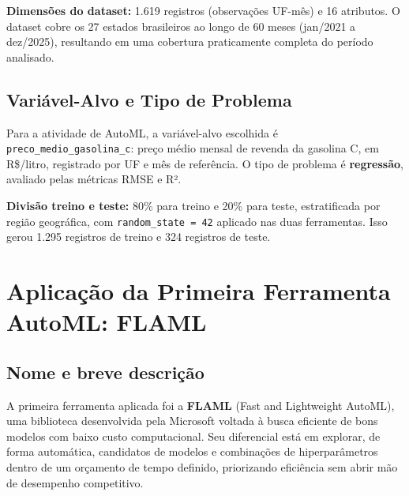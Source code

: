 \documentclass[11pt, a4paper, oneside]{article}
\begin{document}
\begin{infobox}
\textbf{Dimensões do dataset:} 1.619 registros (observações UF-mês) e 16 atributos.
O dataset cobre os 27 estados brasileiros ao longo de 60 meses (jan/2021 a dez/2025),
resultando em uma cobertura praticamente completa do período analisado.
\end{infobox}

\subsection{Variável-Alvo e Tipo de Problema}
\label{sec:dataset-target}

Para a atividade de AutoML, a variável-alvo escolhida é
\texttt{preco\_medio\_gasolina\_c}: preço médio mensal de revenda da gasolina C,
em R\$/litro, registrado por UF e mês de referência. O tipo de problema é
\textbf{regressão}, avaliado pelas métricas RMSE e R².

\begin{notebox}
\textbf{Divisão treino e teste:} 80\% para treino e 20\% para teste, estratificada
por região geográfica, com \texttt{random\_state = 42} aplicado nas duas ferramentas.
Isso gerou 1.295 registros de treino e 324 registros de teste.
\end{notebox}

\newpage

\section{Aplicação da Primeira Ferramenta AutoML: FLAML}
\label{sec:flaml}

\subsection{Nome e breve descrição}
\label{sec:flaml-descricao}

A primeira ferramenta aplicada foi a \textbf{FLAML} (Fast and Lightweight AutoML),
uma biblioteca desenvolvida pela Microsoft voltada à busca eficiente de bons modelos
com baixo custo computacional. Seu diferencial está em explorar, de forma automática,
candidatos de modelos e combinações de hiperparâmetros dentro de um orçamento de
tempo definido, priorizando eficiência sem abrir mão de desempenho competitivo.
\end{document}
